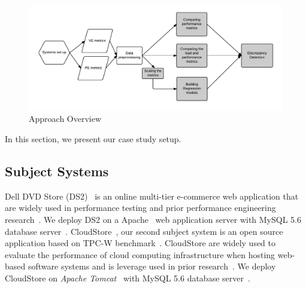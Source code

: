 
\begin{figure}[thb]
	\includegraphics[width=\textwidth]{figures/approach_perf_vr1}
	\caption{Approach Overview}
	\label{fig:Approach}
\end{figure}

In this section, we present our case study setup. %


\subsection{Subject Systems}
Dell DVD Store (DS2)~\cite{delldvd} is an online multi-tier e-commerce web application that are widely used in performance testing and prior performance engineering research~\cite{Shang:2015:ADP:2668930.2688052,Nguyen:2012:ADP:2188286.2188344, jackicsm2009}. We deploy DS2 on a Apache~ web application server with MySQL 5.6 database server~\cite{mysql}. CloudStore~\cite{cloudstore}, our second subject system is an open source application based on TPC-W benchmark~\cite{tpcw}. CloudStore are widely used to evaluate the performance of cloud computing infrastructure when hosting web-based software systems and is leverage used in prior research~\cite{tarekmsr16, andmore}. We deploy CloudStore on \textit{Apache Tomcat}~\cite{tomcat} with MySQL 5.6 database server~\cite{mysql}. 


